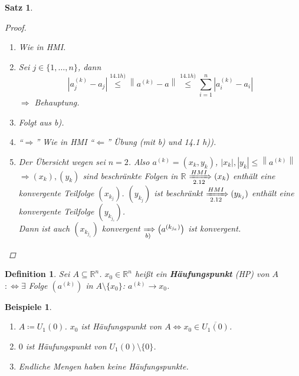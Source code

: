 \documentclass[12pt]{extreport} %
\newcommand{\R}{\mathbb{R}}
\theoremstyle{named}
\theoremstyle{nnamed}
\theoremstyle{itshape}
\newtheorem{satz}[unnamedtheorem]{Satz}
\newtheorem*{definition}{Definition}
\theoremstyle{normal}
\newtheorem*{beispiele}{Beispiele}
\begin{document}
\begin{satz}
	\begin{proof} ~\
		\begin{enumerate}
			\item Wie in HMI.
			\item Sei $j \in \{1, \dotsc, n\}$, dann
				\[ \left| a_{j}^{(k)} - a_{j} \right| \overset{14.1 h)}{\leq} \left\| a^{(k)} - a \right\| \overset{14.1 h)}{\leq} \sum_{i = 1}^{n} \left| a_{i}^{(k)} - a_{i} \right| \]
				$\Rightarrow$ Behauptung.
			\item Folgt aus b).
			\item \enquote{$\Rightarrow$} Wie in HMI \enquote{$\Leftarrow$} Übung (mit b) und 14.1 h)).
			\item Der Übersicht wegen sei $n = 2$. Also $a^{(k)} = (x_{k} , y_{k})$, $|x_{k}|, |y_{k}| \leq \left\| a^{(k)} \right\|$ \\
			$\Rightarrow (x_{k}), (y_{k})$ sind beschränkte Folgen in $\R$ $\xRightarrow[2.12]{HMI} (x_{k})$ enthält eine konvergente Teilfolge $(x_{k_{j}})$. $(y_{k_{j}})$ ist beschränkt $\xRightarrow[2.12]{HMI} (y_{k_{j}})$ enthält eine konvergente Teilfolge $(y_{k_{j_{e}}})$. \\
			Dann ist auch $(x_{k_{j_{e}}})$ konvergent $\xRightarrow[b)]{} \left( a^{(k_{j_{e}})} \right)$ ist konvergent.
		\end{enumerate}
	\end{proof}
\end{satz}

\begin{definition}
	Sei $A \subseteq \R^{n}$. $x_{0} \in \R^{n}$ hei{\ss}t ein \textbf{Häufungspunkt} (HP) von $A$ $: \iff \exists$ Folge $\left(a^{(k)}\right)$ in $A \setminus \{ x_{0} \}$: $a^{(k)} \rightarrow x_{0}$.
\end{definition}


\begin{beispiele} ~\
	\begin{enumerate}
		\item $A \coloneqq U_{1}(0)$. $x_{0}$ ist Häufungspunkt von $A \iff x_{0} \in \overline{U_{1}(0)}$.
		\item $0$ ist Häufungspunkt von $U_{1}(0) \setminus \{ 0 \}$.
		\item Endliche Mengen haben keine Häufungspunkte.
	\end{enumerate}	
\end{beispiele}
\end{document}
